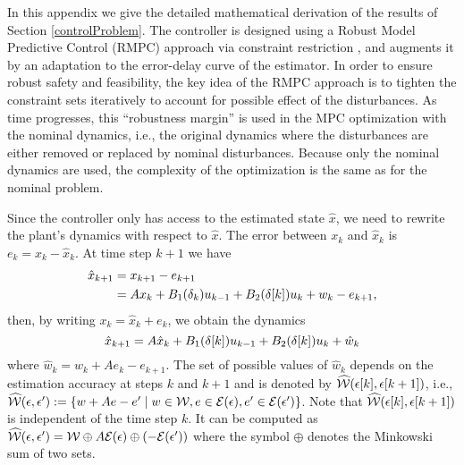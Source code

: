 In this appendix we give the detailed mathematical derivation of the results of Section \ref{controlProblem}.
The controller is designed using a Robust Model Predictive
Control (RMPC) approach via constraint restriction \cite{richardsetal05rmp, chiscietal01swp}, 
and augments it by an adaptation to the error-delay curve of the estimator.
In order to ensure robust safety and feasibility, the key idea of
the RMPC approach is to tighten the constraint sets iteratively to account
for possible effect of the disturbances. 
As time progresses, this ``robustness
margin'' is used in the MPC optimization with the nominal dynamics,
i.e., the original dynamics where the disturbances are either removed
or replaced by nominal disturbances.
Because only the nominal dynamics are used, the complexity of the optimization is the same as for the nominal problem.

Since the controller only has access to the estimated state $\hat{x}$, we need
to rewrite the plant's dynamics with respect to $\hat{x}$. 
The error
between $ $$x_{k}$ and $\hat{x}_{k}$ is $e_{k}=x_{k}-\hat{x}_{k}$.
At time step $k+1$ we have
\begin{align*}
\hat{x}_{k+1} & =x_{k+1}-e_{k+1}\\
 & =Ax_{k}+B_{1}(\delta_k)u_{k-1}+B_{2}(\delta[k])u_{k}+w_{k}-e_{k+1}\text{,}
\end{align*}
 then, by writing $x_{k}=\hat{x}_{k}+e_{k}$, we obtain the dynamics
\begin{equation}
\hat{x}_{k+1}=A\hat{x}_{k}+B_{1}(\delta[k])u_{k-1}+B_{2}(\delta[k])u_{k}+\hat{w}_{k}\label{eq:estimator-dynamics}
\end{equation}
 where $\hat{w}_{k}=w_{k}+Ae_{k}-e_{k+1}$.
The set of possible values of $\hat{w}_{k}$
depends on the estimation accuracy at steps $k$ and $k+1$ and is
denoted by $\widehat{\mathcal{W}}(\epsilon[k],\epsilon[k+1])$, i.e.,
$\widehat{\mathcal{W}}(\epsilon,\epsilon'):= \left\{ w+Ae-e'\;|\; w\in\mathcal{W},e\in\mathcal{E}(\epsilon),e'\in\mathcal{E}(\epsilon')\right\}$.
Note that %
$\widehat{\mathcal{W}}(\epsilon[k],\epsilon[k+1])$ is independent
of the time step $k$. %
It can be computed as $\widehat{\mathcal{W}}(\epsilon,\epsilon')=\mathcal{W}\oplus A\mathcal{E}(\epsilon)\oplus\left(-\mathcal{E}(\epsilon')\right)$
where the symbol $\oplus$ denotes the Minkowski sum of two sets.

